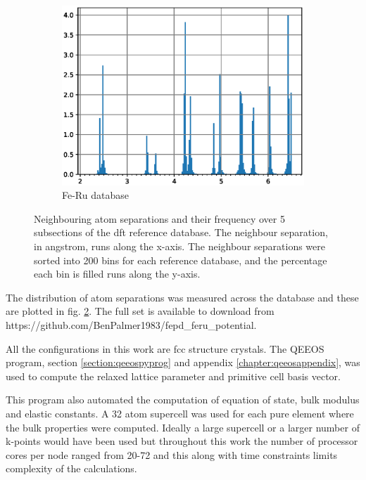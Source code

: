 \begin{figure}
\begin{subfigure}{.49\textwidth}
  \includegraphics[width=.99\linewidth]{chapters/potentials_fe_pd_ru/neighbour_distances/db_feru_neighbours.eps}  
  \caption{Fe-Ru database}
  \label{fig:ferudb}
\end{subfigure}
\caption{Neighbouring atom separations and their frequency over 5 subsections of the \acrshort{dft} reference database.  The neighbour separation, in angstrom, runs along the x-axis.  The neighbour separations were sorted into 200 bins for each reference database, and the percentage each bin is filled runs along the y-axis.}
\label{fig:dbneighbourseparations}
\end{figure}

The distribution of atom separations was measured across the database and these are plotted in fig. \ref{fig:dbneighbourseparations}.  The full set is available to download from https://github.com/BenPalmer1983/fepd\_feru\_potential.

All the configurations in this work are \acrshort{fcc} structure crystals.  The QEEOS program, section \ref{section:qeeospyprog} and appendix \ref{chapter:qeeosappendix}, was used to compute the relaxed lattice parameter and primitive cell basis vector.

This program also automated the computation of equation of state, bulk modulus and elastic constants.  A 32 atom supercell was used for each pure element where the bulk properties were computed.  Ideally a large supercell or a larger number of k-points would have been used but throughout this work the number of processor cores per node ranged from 20-72 and this along with time constraints limits complexity of the calculations.

